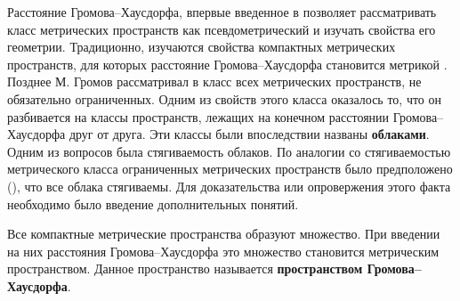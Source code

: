 Расстояние Громова--Хаусдорфа, впервые введенное в \cite{Edwards} позволяет
рассматривать класс метрических пространств как псевдометрический и изучать
свойства его геометрии. Традиционно, изучаются свойства компактных метрических
пространств, для которых расстояние Громова--Хаусдорфа становится метрикой
\cite{gromov_structures_1981}.
Позднее М. Громов рассматривал в \cite{gromov_metric_2001} класс всех
метрических пространств, не обязательно ограниченных. Одним из свойств этого
класса оказалось то, что он разбивается на классы пространств, лежащих на
конечном расстоянии Громова--Хаусдорфа друг от друга. Эти классы были
впоследствии названы \textbf{облаками}. Одним из вопросов была стягиваемость
облаков. По аналогии со стягиваемостью метрического класса ограниченных
метрических пространств было предположено (\cite{gromov_structures_1981}), что
все облака стягиваемы. Для доказательства или опровержения этого факта
необходимо было введение дополнительных понятий.

Все компактные метрические пространства образуют множество. При введении на них
расстояния Громова--Хаусдорфа это множество становится метрическим
пространством. Данное пространство называется \textbf{пространством
Громова--Хаусдорфа}.


